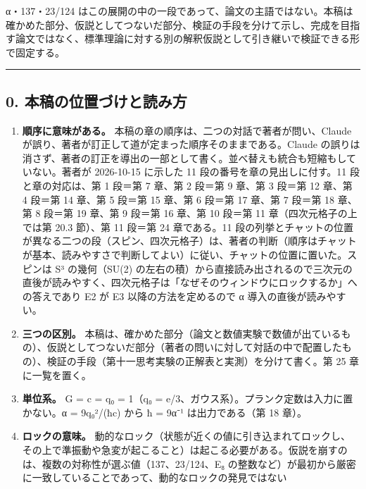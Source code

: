 \documentclass[
  a4paper,
]{ltjsarticle}
\providecommand{\tightlist}{%
  \setlength{\itemsep}{0pt}\setlength{\parskip}{0pt}}
\begin{document}
α・137・23/124
はこの展開の中の一段であって、論文の主語ではない。本稿は確かめた部分、仮説としてつないだ部分、検証の手段を分けて示し、完成を目指す論文ではなく、標準理論に対する別の解釈仮説として引き継いで検証できる形で固定する。

\begin{center}\rule{0.5\linewidth}{0.5pt}\end{center}

\subsection{0.
本稿の位置づけと読み方}\label{ux672cux7a3fux306eux4f4dux7f6eux3065ux3051ux3068ux8aadux307fux65b9}

\begin{enumerate}
\def\labelenumi{\arabic{enumi}.}
\tightlist
\item
  \textbf{順序に意味がある。}
  本稿の章の順序は、二つの対話で著者が問い、Claude
  が誤り、著者が訂正して道が定まった順序そのままである。Claude
  の誤りは消さず、著者の訂正を導出の一部として書く。並べ替えも統合も短縮もしていない。著者が
  2026-10-15 に示した 11 段の番号を章の見出しに付す。11
  段と章の対応は、第 1 段＝第 7 章、第 2 段＝第 9 章、第 3 段＝第 12
  章、第 4 段＝第 14 章、第 5 段＝第 15 章、第 6 段＝第 17 章、第 7
  段＝第 18 章、第 8 段＝第 19 章、第 9 段＝第 16 章、第 10 段＝第 11
  章（四次元格子の上では第 20.3 節）、第 11 段＝第 24 章である。11
  段の列挙とチャットの位置が異なる二つの段（スピン、四次元格子）は、著者の判断（順序はチャットが基本、読みやすさで判断してよい）に従い、チャットの位置に置いた。スピンは
  S³ の幾何（SU(2)
  の左右の積）から直接読み出されるので三次元の直後が読みやすく、四次元格子は「なぜそのウィンドウにロックするか」への答えであり
  E2 が E3 以降の方法を定めるので α 導入の直後が読みやすい。
\item
  \textbf{三つの区別。}
  本稿は、確かめた部分（論文と数値実験で数値が出ているもの）、仮説としてつないだ部分（著者の問いに対して対話の中で配置したもの）、検証の手段（第十一思考実験の正解表と実測）を分けて書く。第
  25 章に一覧を置く。
\item
  \textbf{単位系。} G = c = q₀ = 1（q₀ =
  e/3、ガウス系）。プランク定数は入力に置かない。α = 9q₀²/(ħc) から ħ =
  9α⁻¹ は出力である（第 18 章）。
\item
  \textbf{ロックの意味。}
  動的なロック（状態が近くの値に引き込まれてロックし、その上で準振動や急変が起こること）は起こる必要がある。仮説を崩すのは、複数の対称性が選ぶ値（137、23/124、E₈
  の整数など）が最初から厳密に一致していることであって、動的なロックの発見ではない

\end{enumerate}
\end{document}
